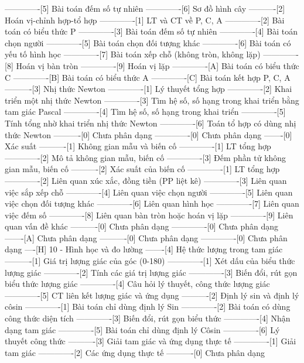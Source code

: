 -------------[5] Bài toán đếm số tự nhiên
-------------[6] Sơ đồ hình cây
----------[2] Hoán vị-chỉnh hợp-tổ hợp
-------------[1] LT và CT về P, C, A
-------------[2] Bài toán có biểu thức P
-------------[3] Bài toán đếm số tự nhiên
-------------[4] Bài toán chọn người
-------------[5] Bài toán chọn đối tượng khác
-------------[6] Bài toán có yếu tố hình học
-------------[7] Bài toán xếp chỗ (không tròn, không lặp)
-------------[8] Hoán vị bàn tròn
-------------[9] Hoán vị lặp
-------------[A] Bài toán có biểu thức C
-------------[B] Bài toán có biểu thức A
-------------[C] Bài toán kết hợp P, C, A
----------[3] Nhị thức Newton
-------------[1] Lý thuyết tổng hợp 
-------------[2] Khai triển một nhị thức Newton
-------------[3] Tìm hệ số, số hạng trong khai triển bằng tam giác Pascal
-------------[4] Tìm hệ số, số hạng trong khai triển
-------------[5] Tính tổng nhờ khai triển nhị thức Newton
-------------[6] Toán tổ hợp có dùng nhị thức Newton
----------[0] Chưa phân dạng
-------------[0] Chưa phân dạng
-------[0] Xác suất
----------[1] Không gian mẫu và biến cố
-------------[1] LT tổng hợp
-------------[2] Mô tả không gian mẫu, biến cố
-------------[3] Đếm phần tử không gian mẫu, biến cố
----------[2] Xác suất của biến cố
-------------[1] LT tổng hợp
-------------[2] Liên quan xúc xắc, đồng tiền (PP liệt kê)
-------------[3] Liên quan việc sắp xếp chỗ
-------------[4] Liên quan việc chọn người
-------------[5] Liên quan việc chọn đối tượng khác
-------------[6] Liên quan hình học
-------------[7] Liên quan việc đếm số
-------------[8] Liên quan bàn tròn hoặc hoán vị lặp
-------------[9] Liên quan vấn đề khác
----------[0] Chưa phân dạng
-------------[0] Chưa phân dạng
-------[A] Chưa phân dạng
----------[0] Chưa phân dạng
-------------[0] Chưa phân dạng
----[H] 10 - Hình học và đo lường
-------[4] Hệ thức lượng trong tam giác
----------[1] Giá trị lượng giác của góc (0-180)
-------------[1] Xét dấu của biểu thức lượng giác
-------------[2] Tính các giá trị lượng giác
-------------[3] Biến đổi, rút gọn biểu thức lượng giác
-------------[4] Câu hỏi lý thuyết, công thức lượng giác
-------------[5] CT liên kết lượng giác và ứng dụng
----------[2] Định lý sin và định lý côsin
-------------[1] Bài toán chỉ dùng định lý Sin 
-------------[2] Bài toán có dùng công thức diện tích
-------------[3] Biến đổi, rút gọn biểu thức
-------------[4] Nhận dạng tam giác
-------------[5] Bài toán chỉ dùng định lý Côsin
-------------[6] Lý thuyết công thức
----------[3] Giải tam giác và ứng dụng thực tế
-------------[1] Giải tam giác
-------------[2] Các ứng dụng thực tế
----------[0] Chưa phân dạng
